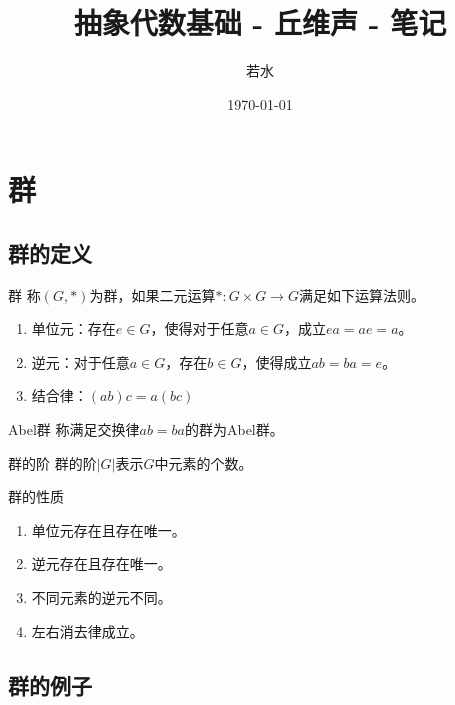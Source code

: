 \documentclass[lang = cn, scheme = chinese, thmcnt = section]{elegantbook}
\title{抽象代数基础 - 丘维声 - 笔记}                %
\author{若水}                        %
\date{\today}                       %
\begin{document}
\maketitle       %

\frontmatter     %

\tableofcontents %

\mainmatter      %

\chapter{群}

\section{群的定义}

\begin{definition}{群}
	称$(G,*)$为群，如果二元运算$* :G\times G\to G$满足如下运算法则。
	\begin{enumerate}
		\item 单位元：存在$e\in G$，使得对于任意$a\in G$，成立$ea=ae=a$。
		\item 逆元：对于任意$a\in G$，存在$b\in G$，使得成立$ab=ba=e$。
		\item 结合律：$(ab)c=a(bc)$
	\end{enumerate}
\end{definition}

\begin{definition}{Abel群}
	称满足交换律$ab=ba$的群为Abel群。
\end{definition}

\begin{definition}{群的阶}
	群的阶$|G|$表示$G$中元素的个数。
\end{definition}

\begin{proposition}{群的性质}
	\begin{enumerate}
		\item 单位元存在且存在唯一。
		\item 逆元存在且存在唯一。
		\item 不同元素的逆元不同。
		\item 左右消去律成立。
	\end{enumerate}
\end{proposition}

\section{群的例子}
\end{document}
